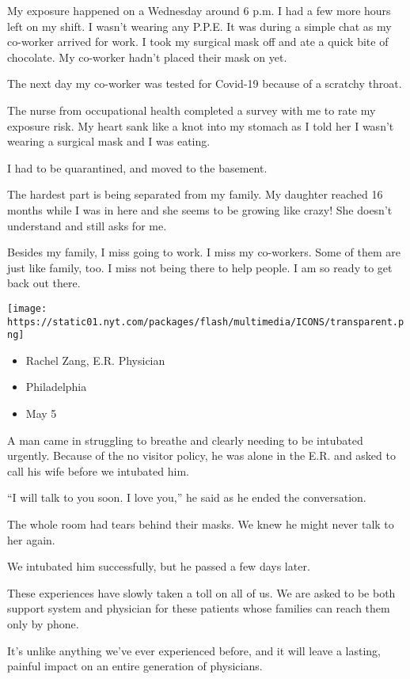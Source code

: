 My exposure happened on a Wednesday around 6 p.m. I had a few more hours
left on my shift. I wasn't wearing any P.P.E. It was during a simple
chat as my co-worker arrived for work. I took my surgical mask off and
ate a quick bite of chocolate. My co-worker hadn't placed their mask on
yet.

The next day my co-worker was tested for Covid-19 because of a scratchy
throat.

The nurse from occupational health completed a survey with me to rate my
exposure risk. My heart sank like a knot into my stomach as I told her I
wasn't wearing a surgical mask and I was eating.

I had to be quarantined, and moved to the basement.

The hardest part is being separated from my family. My daughter reached
16 months while I was in here and she seems to be growing like crazy!
She doesn't understand and still asks for me.

Besides my family, I miss going to work. I miss my co-workers. Some of
them are just like family, too. I miss not being there to help people. I
am so ready to get back out there.

\texttt{[image: https://static01.nyt.com/packages/flash/multimedia/ICONS/transparent.png]}

\begin{itemize}
\tightlist
\item
  Rachel Zang, E.R. Physician
\item
  Philadelphia
\item
  May 5
\end{itemize}

A man came in struggling to breathe and clearly needing to be intubated
urgently. Because of the no visitor policy, he was alone in the E.R. and
asked to call his wife before we intubated him.

``I will talk to you soon. I love you,'' he said as he ended the
conversation.

The whole room had tears behind their masks. We knew he might never talk
to her again.

We intubated him successfully, but he passed a few days later.

These experiences have slowly taken a toll on all of us. We are asked to
be both support system and physician for these patients whose families
can reach them only by phone.

It's unlike anything we've ever experienced before, and it will leave a
lasting, painful impact on an entire generation of physicians.

